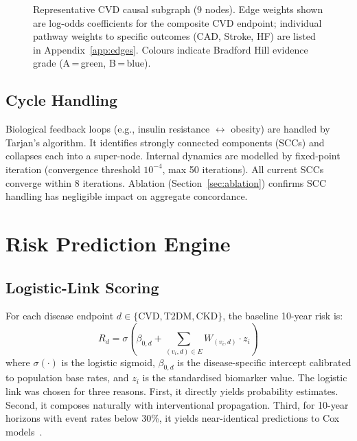 \documentclass[runningheads]{llncs}
\begin{document}
\begin{figure}[t]
\caption{Representative CVD causal subgraph (9 nodes).
Edge weights shown are log-odds coefficients for the composite CVD
endpoint; individual pathway weights to specific outcomes (CAD, Stroke,
HF) are listed in Appendix~\ref{app:edges}.
Colours indicate Bradford Hill evidence grade
(A\,=\,green, B\,=\,blue).}\label{fig:cvd_subgraph}
\end{figure}

\subsection{Cycle Handling}\label{sec:cycles}

Biological feedback loops (e.g., insulin resistance
$\leftrightarrow$ obesity) are handled by Tarjan's algorithm.
It identifies strongly connected components (SCCs) and collapses
each into a super-node.
Internal dynamics are modelled by fixed-point iteration
(convergence threshold $10^{-4}$, max 50 iterations).
All current SCCs converge within 8 iterations.
Ablation (Section~\ref{sec:ablation}) confirms SCC handling has
negligible impact on aggregate concordance.

\section{Risk Prediction Engine}\label{sec:risk}

\subsection{Logistic-Link Scoring}\label{sec:logistic}

For each disease endpoint $d \in \{\text{CVD}, \text{T2DM}, \text{CKD}\}$,
the baseline 10-year risk is:
\begin{equation}\label{eq:risk}
R_d = \sigma\!\left(\beta_{0,d} + \sum_{(v_i, d) \in E} W_{(v_i,d)} \cdot z_i\right)
\end{equation}
where $\sigma(\cdot)$ is the logistic sigmoid, $\beta_{0,d}$ is the
disease-specific intercept calibrated to population base rates, and
$z_i$ is the standardised biomarker value.
The logistic link was chosen for three reasons.
First, it directly yields probability estimates.
Second, it composes naturally with interventional propagation.
Third, for 10-year horizons with event rates below 30\%, it yields
near-identical predictions to Cox
models~\cite{dagostino2008}.
\end{document}
